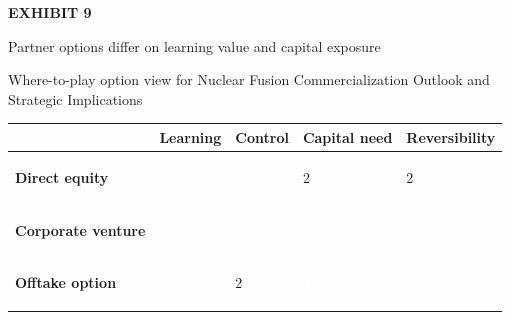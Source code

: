 \documentclass[10pt,a4paper]{article}
\begin{document}
\clearpage
{\textcolor{BOGreen}{\scriptsize\bfseries EXHIBIT 9}}\par\vspace{4pt}
{\sffamily\fontsize{17}{21}\selectfont\color{BONavy} Partner options differ on learning value and capital exposure}\par
{\small\color{BOText} Where-to-play option view for Nuclear Fusion Commercialization Outlook and Strategic Implications}\par\vspace{6pt}
{\scriptsize\begin{tabular}{p{38mm}>{\centering\arraybackslash}p{21mm}>{\centering\arraybackslash}p{21mm}>{\centering\arraybackslash}p{21mm}>{\centering\arraybackslash}p{21mm}}
 & {\bfseries Learning} & {\bfseries Control} & {\bfseries Capital need} & {\bfseries Reversibility} \\
\hline
{\bfseries Direct equity} & \colorbox{BOGreen}{\textcolor{white}{\strut\hspace{5pt}5\hspace{5pt}}} & \colorbox{BOGreen}{\textcolor{white}{\strut\hspace{5pt}4\hspace{5pt}}} & \colorbox{BOLight}{\textcolor{BOText}{\strut\hspace{5pt}2\hspace{5pt}}} & \colorbox{BOLight}{\textcolor{BOText}{\strut\hspace{5pt}2\hspace{5pt}}} \\
{\bfseries Corporate venture} & \colorbox{BOGreen}{\textcolor{white}{\strut\hspace{5pt}4\hspace{5pt}}} & \colorbox{BOBlue}{\textcolor{white}{\strut\hspace{5pt}3\hspace{5pt}}} & \colorbox{BOBlue}{\textcolor{white}{\strut\hspace{5pt}3\hspace{5pt}}} & \colorbox{BOBlue}{\textcolor{white}{\strut\hspace{5pt}3\hspace{5pt}}} \\
{\bfseries Offtake option} & \colorbox{BOBlue}{\textcolor{white}{\strut\hspace{5pt}3\hspace{5pt}}} & \colorbox{BOLight}{\textcolor{BOText}{\strut\hspace{5pt}2\hspace{5pt}}} & \colorbox{BOGreen}{\textcolor{white}{\strut\hspace{5pt}4\hspace{5pt}}} & \colorbox{BOGreen}{\textcolor{white}{\strut\hspace{5pt}4\hspace{5pt}}} \\

\end{tabular}}
\end{document}
